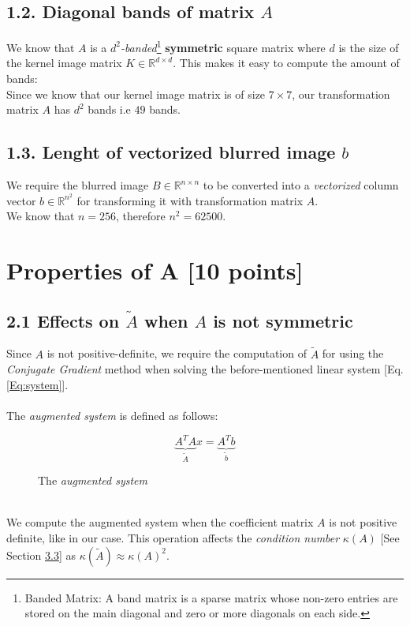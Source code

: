 \documentclass[unicode,11pt,a4paper,oneside,numbers=endperiod,openany]{scrartcl}
\begin{document}
\subsection*{1.2. Diagonal bands of matrix $A$}
We know that $A$ is a \textit{$d^2$-banded}\footnote{Banded Matrix: A band matrix is a sparse matrix whose non-zero entries are stored on the main diagonal and zero or more diagonals on each side.} \textbf{symmetric} square matrix where $d$ is the size of the kernel image matrix $K\in \mathds{R}^{d\times d}$. This makes it easy to compute the amount of bands:\\
Since we know that our kernel image matrix is of size $7 \times 7$, our transformation matrix $A$ has $d^2$ bands i.e $49$ bands.




\subsection*{1.3. Lenght of vectorized blurred image $b$}
We require the blurred image $B\in\mathds{R}^{n\times n}$ to be converted into a \textit{vectorized} column vector $b\in\mathds{R}^{n^2}$ for transforming it with transformation matrix $A$.\\
We know that $n = 256$, therefore $n^2=62500$.

\clearpage
\section{Properties of A [10 points]}
\subsection*{2.1 Effects on $\tilde{A}$ when $A$ is not symmetric}
Since $A$ is not positive-definite, we require the computation of $\tilde{A}$ for using the \textit{Conjugate Gradient} method when solving the before-mentioned linear system [Eq. \ref{Eq:system}].\\\\
The \textit{augmented system} is defined as follows:\\
\begin{figure}[h!]
    \centering
    $$
        \underbrace{A^TA}_{\tilde{A}}x = \underbrace{A^Tb}_{\tilde{b}}
    $$
\caption{The \textit{augmented system}}
\label{fig:augmented_system}
\end{figure}\\
We compute the augmented system when the coefficient matrix $A$ is not positive definite, like in our case.
This operation affects the \textit{condition number} $\kappa(A)$ [See Section \hyperref[condition_number]{3.3}] as $\kappa(\tilde{A}) \approx \kappa(A)^2$. 
\end{document}

